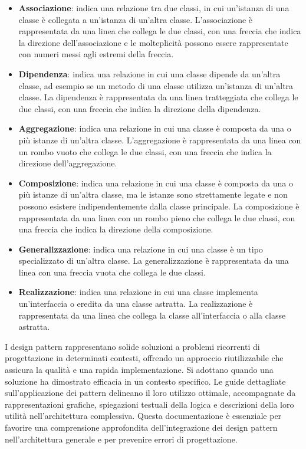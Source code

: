 \begin{itemize}
	\item \textbf{Associazione}: indica una relazione tra due classi, in cui un'istanza di una classe è collegata a un'istanza di un'altra classe. L'associazione è rappresentata da una linea che collega le due classi, con una freccia che indica la direzione dell'associazione e le molteplicità possono essere rappresentate con numeri messi agli estremi della freccia.
	\item \textbf{Dipendenza}: indica una relazione in cui una classe dipende da un'altra classe, ad esempio se un metodo di una classe utilizza un'istanza di un'altra classe. La dipendenza è rappresentata da una linea tratteggiata che collega le due classi, con una freccia che indica la direzione della dipendenza.
	\item \textbf{Aggregazione}: indica una relazione in cui una classe è composta da una o più istanze di un'altra classe. L'aggregazione è rappresentata da una linea con un rombo vuoto che collega le due classi, con una freccia che indica la direzione dell'aggregazione.
	\item \textbf{Composizione}: indica una relazione in cui una classe è composta da una o più istanze di un'altra classe, ma le istanze sono strettamente legate e non possono esistere indipendentemente dalla classe principale. La composizione è rappresentata da una linea con un rombo pieno che collega le due classi, con una freccia che indica la direzione della composizione.
	\item \textbf{Generalizzazione}: indica una relazione in cui una classe è un tipo specializzato di un'altra classe. La generalizzazione è rappresentata da una linea con una freccia vuota che collega le due classi.
	\item \textbf{Realizzazione}: indica una relazione in cui una classe implementa un'interfaccia o eredita da una classe astratta. La realizzazione è rappresentata da una linea che collega la classe all'interfaccia o alla classe astratta.
\end{itemize}

I design pattern rappresentano solide soluzioni a problemi ricorrenti di progettazione in determinati contesti, offrendo un approccio riutilizzabile che assicura la qualità e una rapida implementazione. Si adottano quando una soluzione ha dimostrato efficacia in un contesto specifico. Le guide dettagliate sull'applicazione dei pattern delineano il loro utilizzo ottimale, accompagnate da rappresentazioni grafiche, spiegazioni testuali della logica e descrizioni della loro utilità nell'architettura complessiva. Questa documentazione è essenziale per favorire una comprensione approfondita dell'integrazione dei design pattern nell'architettura generale e per prevenire errori di progettazione.

